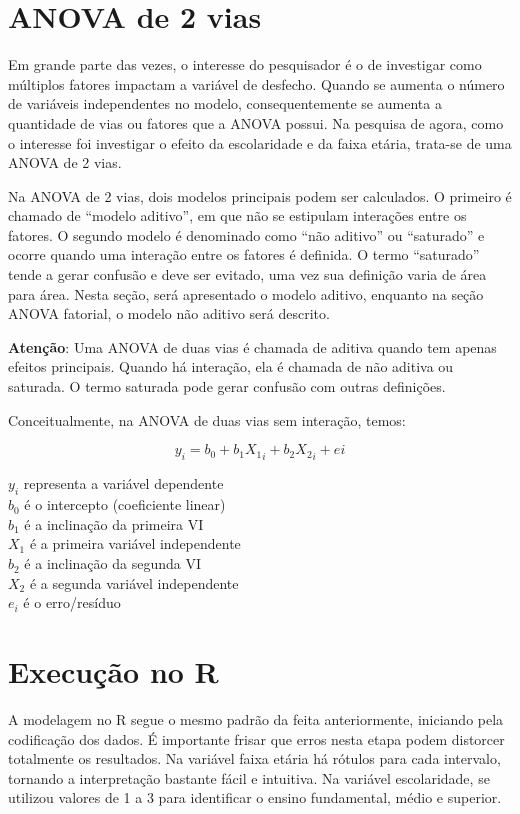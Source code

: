 \documentclass[
]{book}
\begin{document}
\hypertarget{anova-de-2-vias}{%
\section{ANOVA de 2 vias}\label{anova-de-2-vias}}

Em grande parte das vezes, o interesse do pesquisador é o de investigar como múltiplos fatores impactam a variável de desfecho. Quando se aumenta o número de variáveis independentes no modelo, consequentemente se aumenta a quantidade de vias ou fatores que a ANOVA possui. Na pesquisa de agora, como o interesse foi investigar o efeito da escolaridade e da faixa etária, trata-se de uma ANOVA de 2 vias.

Na ANOVA de 2 vias, dois modelos principais podem ser calculados. O primeiro é chamado de ``modelo aditivo'', em que não se estipulam interações entre os fatores. O segundo modelo é denominado como ``não aditivo'' ou ``saturado'' e ocorre quando uma interação entre os fatores é definida. O termo ``saturado'' tende a gerar confusão e deve ser evitado, uma vez sua definição varia de área para área. Nesta seção, será apresentado o modelo aditivo, enquanto na seção ANOVA fatorial, o modelo não aditivo será descrito.

\textbf{Atenção}: Uma ANOVA de duas vias é chamada de aditiva quando tem apenas efeitos principais. Quando há interação, ela é chamada de não aditiva ou saturada. O termo saturada pode gerar confusão com outras definições.

Conceitualmente, na ANOVA de duas vias sem interação, temos:

\[y_i = b_0 + b_1X{_1}_i + b_2X{_2}_i + ei\]

\(y_i\) representa a variável dependente\\
\(b_0\) é o intercepto (coeficiente linear)\\
\(b_1\) é a inclinação da primeira VI\\
\(X_1\) é a primeira variável independente\\
\(b_2\) é a inclinação da segunda VI\\
\(X_2\) é a segunda variável independente\\
\(e_i\) é o erro/resíduo

\hypertarget{execuuxe7uxe3o-no-r-8}{%
\section{Execução no R}\label{execuuxe7uxe3o-no-r-8}}

A modelagem no R segue o mesmo padrão da feita anteriormente, iniciando pela codificação dos dados. É importante frisar que erros nesta etapa podem distorcer totalmente os resultados. Na variável faixa etária há rótulos para cada intervalo, tornando a interpretação bastante fácil e intuitiva. Na variável escolaridade, se utilizou valores de 1 a 3 para identificar o ensino fundamental, médio e superior.
\end{document}
